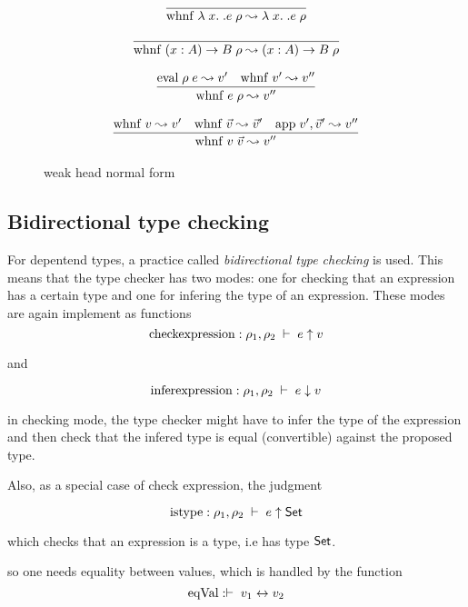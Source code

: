 \begin{figure}[p]
\[
\begin{array}{c}

\infer{\Whnf{\lam x . e \; \rho}{\lam x . e \; \rho}}{}

\end{array}
\]

\[
\begin{array}{c}
\infer{\Whnf{\EPi{x}{A}{B} \; \rho}{\EPi{x}{A}{B} \; \rho}}{}
\end{array}
\]

\[
\begin{array}{c}
\infer{\Whnf{e \; \rho}{v''}}
{\Eval{\rho}{e}{v'}
& \Whnf{v'}{v''} 
}
\end{array}
\]

\[
\begin{array}{c}
\infer{\Whnf{v \; \vec{v}}{v''}}
{
\Whnf{v}{v'}
& \Whnf{\vec{v}}{\vec{v}'}
& {\App{v'}{\vec{v}'}{v''}}
}
\end{array}
\]

\caption{weak head normal form}
\end{figure}

\subsection{Bidirectional type checking} 
For depentend types, a practice called \emph{bidirectional type checking} is used.
This means that the type checker has two modes:
one for checking that an expression has a certain type and one for infering the type of an expression.
These modes are again implement as functions
\[ \mathrm{check expression} :  \Check{\rho_1}{\rho_2}{e}{v}\]

and

\[ \mathrm{infer expression} : \Infer{\rho_1}{\rho_2}{e}{v}\]

in checking mode, the type checker might have to infer the type of the expression and then check that the infered
type is equal (convertible) against the proposed type.

Also, as a special case of check expression, the judgment 

\[ \mathrm{is type} : \IsType{\rho_1}{\rho_2}{e}\]

which checks that an expression is a type, i.e has type $\Set$.

so one needs equality between values, which is handled by the function
\[ \mathrm{eqVal} : \EqVal{v_1}{v_2} \]


